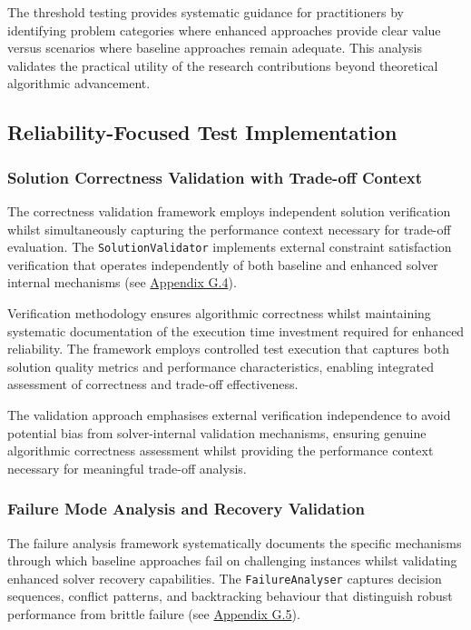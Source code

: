 The threshold testing provides systematic guidance for practitioners by identifying problem categories where enhanced approaches provide clear value versus scenarios where baseline approaches remain adequate. This analysis validates the practical utility of the research contributions beyond theoretical algorithmic advancement.

\subsection{Reliability-Focused Test Implementation}
\label{sec:reliability-focused-testing}

\subsubsection{Solution Correctness Validation with Trade-off Context}
\label{sec:correctness-with-tradeoff}

The correctness validation framework employs independent solution verification whilst simultaneously capturing the performance context necessary for trade-off evaluation. The \texttt{SolutionValidator} implements external constraint satisfaction verification that operates independently of both baseline and enhanced solver internal mechanisms (see \hyperref[appendix:independent-validation]{Appendix G.4}).

Verification methodology ensures algorithmic correctness whilst maintaining systematic documentation of the execution time investment required for enhanced reliability. The framework employs controlled test execution that captures both solution quality metrics and performance characteristics, enabling integrated assessment of correctness and trade-off effectiveness.

The validation approach emphasises external verification independence to avoid potential bias from solver-internal validation mechanisms, ensuring genuine algorithmic correctness assessment whilst providing the performance context necessary for meaningful trade-off analysis.

\subsubsection{Failure Mode Analysis and Recovery Validation}
\label{sec:failure-mode-analysis}

The failure analysis framework systematically documents the specific mechanisms through which baseline approaches fail on challenging instances whilst validating enhanced solver recovery capabilities. The \texttt{FailureAnalyser} captures decision sequences, conflict patterns, and backtracking behaviour that distinguish robust performance from brittle failure (see \hyperref[appendix:failure-analysis]{Appendix G.5}).

